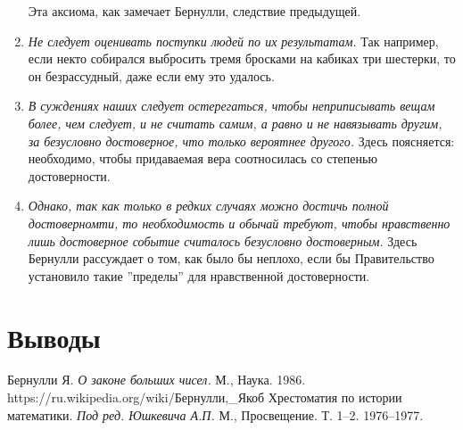 \documentclass[12pt]{article}
\begin{document}
\begin{enumerate}
	Эта аксиома, как замечает Бернулли, следствие предыдущей.
	\item \textit{Не следует оценивать поступки людей по их результатам.}
	Так например, если некто собирался выбросить тремя бросками на кабиках три шестерки, то он безрассудный, даже если ему это удалось.
	\item \textit{В суждениях наших следует остерегаться, чтобы неприписывать вещам более, чем следует, и не считать самим, а равно и не навязывать другим, за безусловно достоверное, что только вероятнее другого.}
	Здесь поясняется: необходимо, чтобы придаваемая вера соотносилась со степенью достоверности.
	\item \textit{Однако, так как только в редких случаях можно достичь полной достоверномти, то необходимость и обычай требуют, чтобы нравственно лишь достоверное событие считалось безусловно достоверным.}
	Здесь Бернулли рассуждает о том, как было бы неплохо, если бы Правительство установило такие ''пределы'' для нравственной достоверности.
\end{enumerate}
\newpage
\section{Выводы}

\newpage
\begin{thebibliography}{99}
 Бернулли Я. \textit{О законе больших чисел.} М., Наука. 1986.
 https://ru.wikipedia.org/wiki/Бернулли,\_Якоб
 Хрестоматия по истории математики. \textit{Под ред. Юшкевича А.П.} М., Просвещение. Т. 1–2. 1976–1977.

\end{thebibliography}
\end{document}
